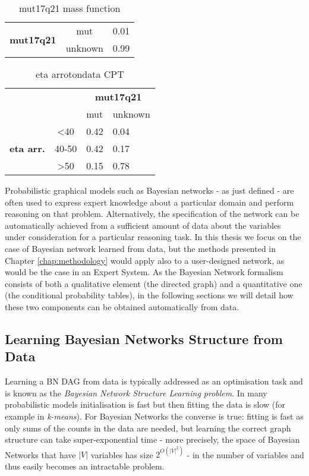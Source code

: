 \begin{table*}[htbp]
\centering
\caption{mut17q21 mass function}
\begin{tabularx}{0.5\textwidth}{ccX}
\toprule
 \multirow{2}{*}{\textbf{mut17q21}} & mut & 0.01  \\
 & unknown & 0.99 \\
\bottomrule
\end{tabularx}
\label{tab:mut-cpd}
\end{table*}

\begin{table*}[htbp]
\centering
\caption{eta arrotondata CPT}
\begin{tabularx}{0.5\textwidth}{ccXX}
\toprule
      & &  \multicolumn{2}{c}{\textbf{mut17q21}} \\
\cmidrule(lr){3-4}
 & & mut & unknown    \\ 
 \multirow{3}{*}{\textbf{eta arr.}}  & <40 & 0.42 & 0.04  \\
 & 40-50 & 0.42 & 0.17    \\
 & >50 & 0.15 & 0.78 \\
\bottomrule
\end{tabularx}
\label{tab:eta-cpd}
\end{table*}

Probabilistic graphical models such as Bayesian networks - as just defined - are often used to express expert knowledge about a particular domain and perform reasoning on that problem. 
Alternatively, the specification of the network can be automatically achieved from a sufficient amount of data about the variables under consideration for a particular reasoning task. 
In this thesis we focus on the case of Bayesian network learned from data, but the methods presented in Chapter \ref{chap:methodology} would apply also to a user-designed network, as would be the case in an Expert System. 
As the Bayesian Network formalism consists of both a qualitative element (the directed graph) and a quantitative one (the conditional probability tables), in the following sections we will detail how these two components can be obtained automatically from data.

\subsection{Learning Bayesian Networks Structure from Data} \label{subsec:learning-bn-structure} 
Learning a BN DAG from data is typically addressed as an optimisation task and is known as the \textit{Bayesian Network Structure Learning problem}. 
In many probabilistic models initialisation is fast but then fitting the data is slow (for example in \textit{k-means}).
For Bayesian Networks the converse is true: fitting is fast as only sums of the counts in the data are needed, but learning the correct graph structure can take super-exponential time - more precisely, the space of Bayesian Networks that have $|V|$ variables has size $2^{O(|V|^2)}$ \citep{berzan2012exploration} - in the number of variables and thus easily becomes an intractable problem.

